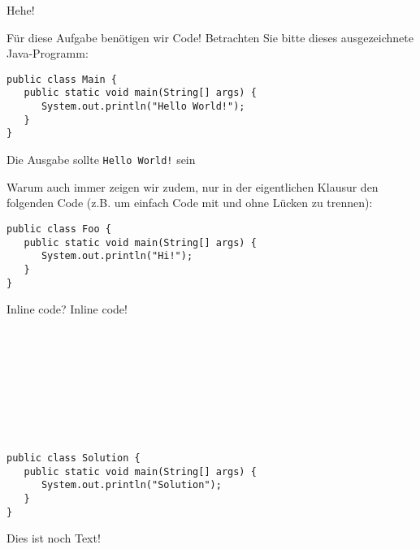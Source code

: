\begin{task}[5]{Hehe!}
\label{ex:second}%

Für diese Aufgabe benötigen wir Code!
Betrachten Sie bitte dieses ausgezeichnete Java-Programm:

\begin{verbatim}
public class Main {
   public static void main(String[] args) {
      System.out.println("Hello World!");
   }
}
\end{verbatim}
\begin{examples}[Hier ein \ifnum\examplescount=1 Beispiel\else paar Beispiele\fi:]
   \item Die Ausgabe sollte \texttt{Hello World!} sein
\end{examples}

\ifexam
Warum auch immer zeigen wir zudem, nur in der eigentlichen Klausur den folgenden Code (z.B. um einfach Code mit und ohne Lücken zu trennen):

\begin{verbatim}
public class Foo {
   public static void main(String[] args) {
      System.out.println("Hi!");
   }
}
\end{verbatim}
\bigskip

\IndentGuides{9cm}

\IndentGuidesDistance{0.5cm}
\IndentGuides[4]{5cm}

\fi


Inline code? Inline code!

\\
\\
\\
\\
\\
\\
\\

\begin{solution}\begin{verbatim}
public class Solution {
   public static void main(String[] args) {
      System.out.println("Solution");
   }
}
\end{verbatim}
Dies ist noch Text!\end{solution}


\end{task}
